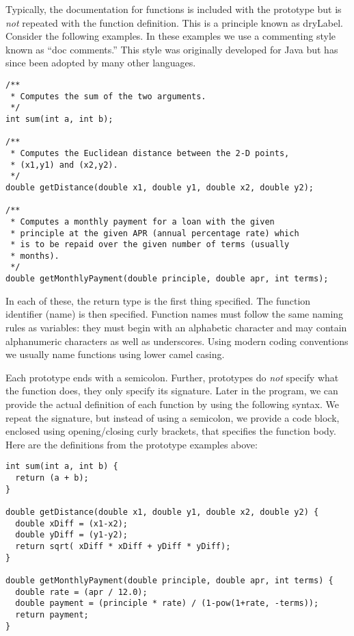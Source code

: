 Typically, the documentation for functions is included with the prototype
but is \emph{not} repeated with the function definition.  This is a 
principle known as \gls{dryLabel}.  Consider the following examples.
In these examples we use a commenting style known as ``doc comments.''
This style was originally developed for Java but has since been 
adopted by many other languages.

\begin{verbatim}
/**
 * Computes the sum of the two arguments.
 */
int sum(int a, int b);

/**
 * Computes the Euclidean distance between the 2-D points, 
 * (x1,y1) and (x2,y2).
 */
double getDistance(double x1, double y1, double x2, double y2);

/**
 * Computes a monthly payment for a loan with the given
 * principle at the given APR (annual percentage rate) which
 * is to be repaid over the given number of terms (usually
 * months).
 */
double getMonthlyPayment(double principle, double apr, int terms);
\end{verbatim}

In each of these, the return type is the first thing specified.  The 
function identifier (name) is then specified.  Function names must
follow the same naming rules as variables: they must begin with
an alphabetic character and may contain alphanumeric characters
as well as underscores.  Using modern coding conventions 
we usually name functions using lower camel casing.

Each prototype ends with a semicolon.  Further, 
prototypes do \emph{not} specify what the function does, they
only specify its signature.  Later in the program, we can provide
the actual definition of each function by using the following syntax.
We repeat the signature, but instead of using a semicolon, we provide
a code block, enclosed using opening/closing curly brackets, that
specifies the function body.  Here are the definitions from the 
prototype examples above:

\begin{verbatim}
int sum(int a, int b) {
  return (a + b);
}

double getDistance(double x1, double y1, double x2, double y2) {
  double xDiff = (x1-x2);
  double yDiff = (y1-y2);
  return sqrt( xDiff * xDiff + yDiff * yDiff);
}

double getMonthlyPayment(double principle, double apr, int terms) {
  double rate = (apr / 12.0);
  double payment = (principle * rate) / (1-pow(1+rate, -terms));
  return payment;
}
\end{verbatim}

